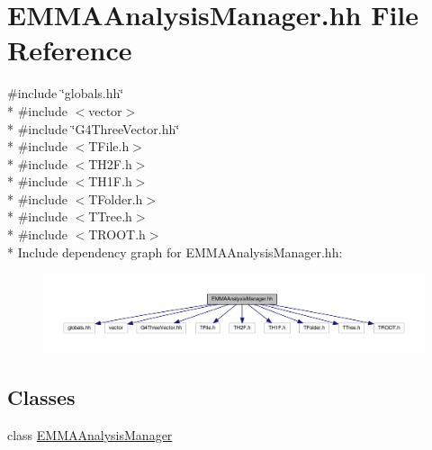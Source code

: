 \hypertarget{EMMAAnalysisManager_8hh}{}\section{E\+M\+M\+A\+Analysis\+Manager.\+hh File Reference}
\label{EMMAAnalysisManager_8hh}
{\ttfamily \#include \char`\"{}globals.\+hh\char`\"{}}\\*
{\ttfamily \#include $<$vector$>$}\\*
{\ttfamily \#include \char`\"{}G4\+Three\+Vector.\+hh\char`\"{}}\\*
{\ttfamily \#include $<$T\+File.\+h$>$}\\*
{\ttfamily \#include $<$T\+H2\+F.\+h$>$}\\*
{\ttfamily \#include $<$T\+H1\+F.\+h$>$}\\*
{\ttfamily \#include $<$T\+Folder.\+h$>$}\\*
{\ttfamily \#include $<$T\+Tree.\+h$>$}\\*
{\ttfamily \#include $<$T\+R\+O\+O\+T.\+h$>$}\\*
Include dependency graph for E\+M\+M\+A\+Analysis\+Manager.\+hh\+:
\nopagebreak
\begin{figure}[H]
\begin{center}
\leavevmode
\includegraphics[width=350pt]{EMMAAnalysisManager_8hh__incl}
\end{center}
\end{figure}
\subsection*{Classes}
\begin{DoxyCompactItemize}
\item 
class \hyperlink{classEMMAAnalysisManager}{E\+M\+M\+A\+Analysis\+Manager}
\end{DoxyCompactItemize}
